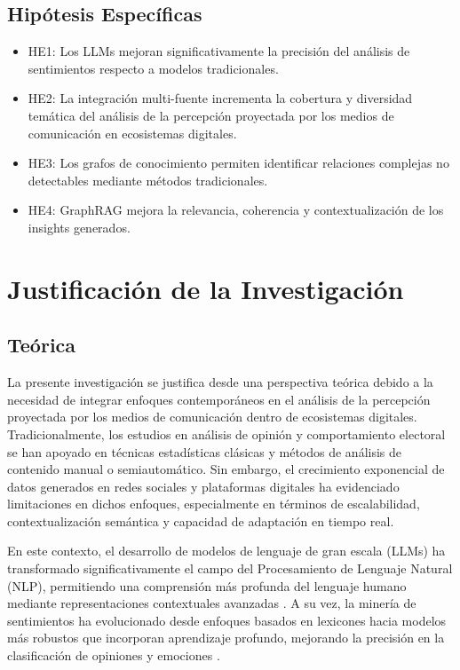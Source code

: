 \subsection{Hipótesis Específicas}

\newcommand{\Hone}{Los LLMs mejoran significativamente la precisión del análisis de sentimientos respecto a modelos tradicionales.}
\newcommand{\Htwo}{La integración multi-fuente incrementa la cobertura y diversidad temática del análisis de la percepción proyectada por los medios de comunicación en ecosistemas digitales.}
\newcommand{\Hthree}{Los grafos de conocimiento permiten identificar relaciones complejas no detectables mediante métodos tradicionales.}
\newcommand{\Hfour}{GraphRAG mejora la relevancia, coherencia y contextualización de los insights generados.}

\begin{itemize}
	\item HE1: \Hone
	\item HE2: \Htwo
	\item HE3: \Hthree
	\item HE4: \Hfour
\end{itemize}


\section{Justificación de la Investigación}

\subsection{Teórica}

La presente investigación se justifica desde una perspectiva teórica debido a la necesidad de integrar enfoques contemporáneos en el análisis de la percepción proyectada por los medios de comunicación dentro de ecosistemas digitales. Tradicionalmente, los estudios en análisis de opinión y comportamiento electoral se han apoyado en técnicas estadísticas clásicas y métodos de análisis de contenido manual o semiautomático. Sin embargo, el crecimiento exponencial de datos generados en redes sociales y plataformas digitales ha evidenciado limitaciones en dichos enfoques, especialmente en términos de escalabilidad, contextualización semántica y capacidad de adaptación en tiempo real.

En este contexto, el desarrollo de modelos de lenguaje de gran escala (LLMs) ha transformado significativamente el campo del Procesamiento de Lenguaje Natural (NLP), permitiendo una comprensión más profunda del lenguaje humano mediante representaciones contextuales avanzadas \parencite{tec_devlin2018bert, tec_brown2020gpt3}. A su vez, la minería de sentimientos ha evolucionado desde enfoques basados en lexicones hacia modelos más robustos que incorporan aprendizaje profundo, mejorando la precisión en la clasificación de opiniones y emociones \parencite{pr_pang2008opinion}.

